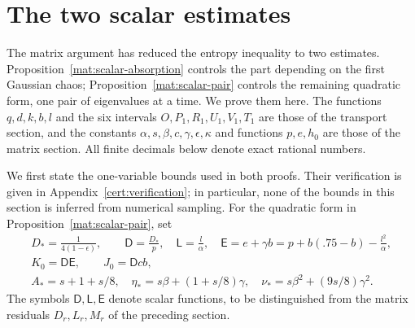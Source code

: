 \documentclass[11pt]{article}
\theoremstyle{definition}
\theoremstyle{remark}
\numberwithin{equation}{section}
\begin{document}
\section{The two scalar estimates}\label{sc:scalar}\label{sc:section}

The matrix argument has reduced the entropy inequality to two estimates.
Proposition~\ref{mat:scalar-absorption} controls the part depending on the
first Gaussian chaos; Proposition~\ref{mat:scalar-pair} controls the remaining
quadratic form, one pair of eigenvalues at a time.  We prove them here.
The functions $q,d,k,b,l$ and the six intervals
$O,P_1,R_1,U_1,V_1,T_1$ are those of the transport section, and the constants
$\alpha,s,\beta,c,\gamma,\epsilon,\kappa$ and functions $p,e,h_0$ are those
of the matrix section.  All finite decimals below denote exact rational
numbers.

We first state the one-variable bounds used in both proofs.  Their verification
is given in Appendix~\ref{cert:verification}; in particular, none of the
bounds in this section is inferred from numerical sampling.  For the
quadratic form in Proposition~\ref{mat:scalar-pair}, set
\begin{equation}\label{sc:auxiliary-functions}
 \begin{gathered}
 D_*=\frac{1}{4(1-\epsilon)},\qquad
 \mathsf D=\frac{D_*}{p},\quad \mathsf L=\frac{l}{\alpha},\quad
 \mathsf E=e+\gamma b
       =p+b(.75-b)-\frac{l^2}{\alpha},\\
 K_0=\mathsf D\mathsf E,\qquad J_0=\mathsf D cb,\\
 A_*=s+1+s/8,\quad
 \eta_*=s\beta+(1+s/8)\gamma,\quad
 \nu_*=s\beta^2+(9s/8)\gamma^2.
 \end{gathered}
\end{equation}
The symbols $\mathsf D,\mathsf L,\mathsf E$ denote scalar functions, to
be distinguished from the matrix residuals $D_r,L_r,M_r$ of the preceding
section.
\end{document}
